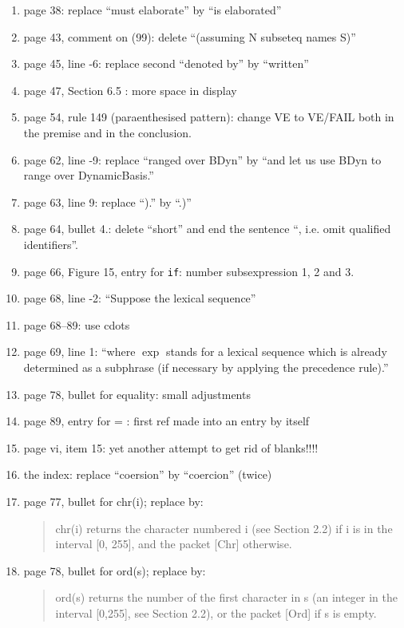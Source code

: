 \begin{description}
\begin{enumerate}
\item page 38: replace ``must elaborate'' by ``is elaborated''
\item page 43, comment on  (99): delete ``(assuming N subseteq names S)''
\item page 45, line -6: replace second ``denoted by'' by ``written''
\item page 47, Section 6.5 : more space in display
\item page 54, rule 149 (paraenthesised pattern): change VE to VE/FAIL
      both in the premise and in the conclusion.
\item page 62, line -9: replace ``ranged over BDyn'' by ``and let us
      use BDyn to range over DynamicBasis.''
\item page 63, line 9: replace ``).'' by ``.)''
\item page 64, bullet 4.: delete ``short'' and end the sentence
      ``, i.e. omit qualified identifiers''.
\item page 66, Figure 15, entry for {\tt if}: number subsexpression 1, 2 and 3.
\item page 68, line -2: ``Suppose the lexical sequence''
\item page 68--89: use cdots
\item page 69, line 1: ``where $\exp$ stands for a lexical sequence which 
      is already determined as a subphrase (if necessary by applying the 
      precedence rule).''
\item page 78, bullet for equality: small adjustments
\item page 89, entry for = : first ref made into an entry by itself
\item page vi, item 15: yet another attempt to get rid of blanks!!!!
\item the index: replace ``coersion'' by ``coercion'' (twice)


\item page 77, bullet for chr(i); replace by:
\begin{quote}        
        chr(i) returns the character numbered i (see Section 2.2) 
	if i is in the interval [0, 255], and the packet [Chr] otherwise.
\end{quote}
\item page 78, bullet for ord(s); replace by:
\begin{quote}
        ord(s) returns the number of the first character in s (an integer
	in the interval [0,255], see Section 2.2), or the packet [Ord]
	if s is empty.
\end{quote}
\end{enumerate}
\end{description}
